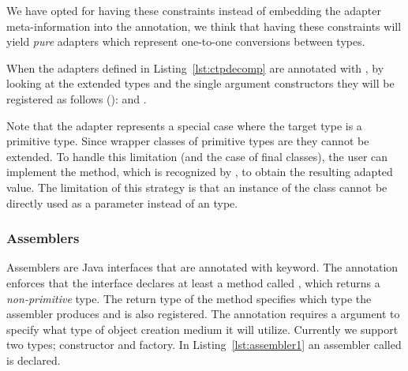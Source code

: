 We have opted for having these constraints instead of embedding the adapter meta-information into the annotation, we think that having these constraints will yield \emph{pure} adapters which represent one-to-one conversions between types. 

When the adapters defined in Listing~\ref{lst:ctpdecomp} are annotated with , by looking at the extended types and the single argument constructors they will be registered as follows ():  and . 

Note that the adapter  represents a special case where the target type is a primitive type.
Since wrapper classes of primitive types are  they cannot be extended.
To handle this limitation (and the case of final classes), the user can implement the  method, which is recognized by \zamk, to obtain the resulting adapted value. 
The limitation of this strategy is that an instance of the  class cannot be directly used as a parameter instead of an  type. 





\subsubsection{Assemblers}
Assemblers are Java interfaces that are annotated with  keyword. 
The  annotation enforces that the interface declares at least a method called , which returns a \emph{non-primitive} type. 
The return type of the  method specifies which type the assembler produces and is also registered.
The  annotation requires a  argument to specify what type of object creation medium it will utilize. 
Currently we support two types; constructor and factory. 
In Listing~\ref{lst:assembler1} an assembler called  is declared. 

